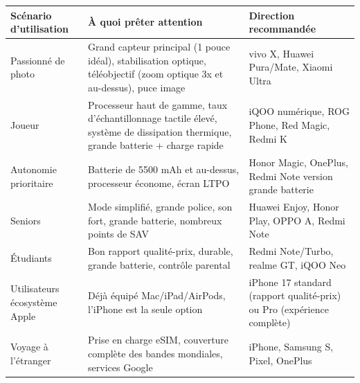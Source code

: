\begin{center}
\begin{tabularx}{\linewidth}{|X|X|X|}
\hline
\textbf{Scénario d'utilisation} & \textbf{À quoi prêter attention} & \textbf{Direction recommandée} \tabularnewline
\hline
Passionné de photo & Grand capteur principal (1 pouce idéal), stabilisation optique, téléobjectif (zoom optique 3x et au-dessus), puce image & vivo X, Huawei Pura/Mate, Xiaomi Ultra \tabularnewline
Joueur & Processeur haut de gamme, taux d'échantillonnage tactile élevé, système de dissipation thermique, grande batterie + charge rapide & iQOO numérique, ROG Phone, Red Magic, Redmi K \tabularnewline
Autonomie prioritaire & Batterie de 5500 mAh et au-dessus, processeur économe, écran LTPO & Honor Magic, OnePlus, Redmi Note version grande batterie \tabularnewline
Seniors & Mode simplifié, grande police, son fort, grande batterie, nombreux points de SAV & Huawei Enjoy, Honor Play, OPPO A, Redmi Note \tabularnewline
Étudiants & Bon rapport qualité-prix, durable, grande batterie, contrôle parental & Redmi Note/Turbo, realme GT, iQOO Neo \tabularnewline
Utilisateurs écosystème Apple & Déjà équipé Mac/iPad/AirPods, l'iPhone est la seule option & iPhone 17 standard (rapport qualité-prix) ou Pro (expérience complète) \tabularnewline
Voyage à l'étranger & Prise en charge eSIM, couverture complète des bandes mondiales, services Google & iPhone, Samsung S, Pixel, OnePlus \tabularnewline
\hline
\end{tabularx}
\end{center}


